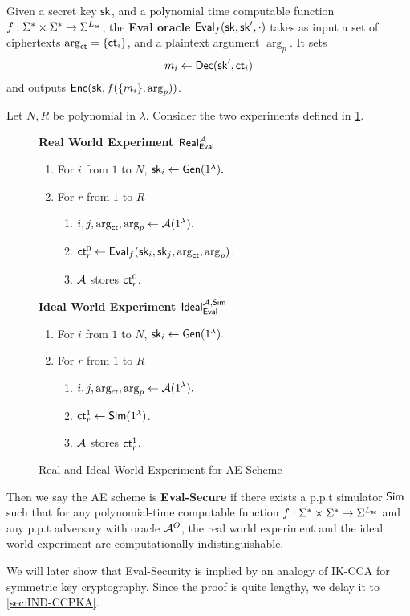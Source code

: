 \begin{definition}
\label{defn:AE-eval-oracle}
Given a secret key ${\mathsf{sk}}$, and a polynomial time computable function $f: \Sigma^* \times \Sigma^* \to \Sigma^{L_{\mathsf{ae}}}$, the \textbf{Eval oracle} $\mathsf{Eval}_{f}({\mathsf{sk}}, {\mathsf{sk}}', \cdot)$ takes as input a set of ciphertexts $\arg_{\mathsf{ct}} = \{\mathsf{ct}_i\}$, and a plaintext argument $\arg_{p}$. It sets 
$$m_i \leftarrow \mathsf{Dec}({\mathsf{sk}}', \mathsf{ct}_i)$$ 
and outputs $\mathsf{Enc}({\mathsf{sk}}, f(\{m_i\}, \arg_p))$.
\end{definition}
\begin{definition}
\label{defn:AE-eval-security}
Let $N, R$ be polynomial in $\lambda$. Consider the two experiments defined in \cref{expr:AE-real-ideal-world}.

\begin{figure}[h!]
\begin{framed}
\textbf{Real World Experiment $\mathsf{Real}_{\mathsf{Eval}}^{\mathcal{A}}$}
\begin{enumerate}
    \item For $i$ from $1$ to $N$, ${\mathsf{sk}}_i \leftarrow \mathsf{Gen}(1^{\lambda}).$
    \item For $r$ from $1$ to $R$
    \begin{enumerate}
        \item $i, j, \arg_{\mathsf{ct}}, \arg_p \leftarrow \mathcal{A}(1^{\lambda}).$
        \item $\mathsf{ct}^{0}_r \leftarrow \mathsf{Eval}_f({\mathsf{sk}}_i, {\mathsf{sk}}_j, \arg_{\mathsf{ct}}, \arg_p)$.
        \item $\mathcal{A}$ stores $\mathsf{ct}^{0}_r$.
    \end{enumerate}
\end{enumerate}
\textbf{Ideal World Experiment $\mathsf{Ideal}_{\mathsf{Eval}}^{\mathcal{A}, \mathsf{Sim}}$}
\begin{enumerate}
    \item For $i$ from $1$ to $N$, ${\mathsf{sk}}_i \leftarrow \mathsf{Gen}(1^{\lambda}).$
    \item For $r$ from $1$ to $R$
    \begin{enumerate}
        \item $i, j, \arg_{\mathsf{ct}}, \arg_p \leftarrow \mathcal{A}(1^{\lambda}).$
        \item $\mathsf{ct}^{1}_r \leftarrow \mathsf{Sim}(1^{\lambda})$.
        \item $\mathcal{A}$ stores $\mathsf{ct}^{1}_r$.
    \end{enumerate}
\end{enumerate}
\end{framed}
\caption{Real and Ideal World Experiment for AE Scheme}
\label{expr:AE-real-ideal-world}
\end{figure}

Then we say the AE scheme is \textbf{Eval-Secure} if there exists a p.p.t simulator $\mathsf{Sim}$ such that for any polynomial-time computable function $f: \Sigma^* \times \Sigma^* \to \Sigma^{L_{\mathsf{ae}}}$ and any p.p.t adversary with oracle $\mathcal{A}^O$, the real world experiment and the ideal world experiment are computationally indistinguishable.
\end{definition}
We will later show that Eval-Security is implied by an analogy of IK-CCA \cite[Definition 1]{BBDP01keyprivate} for symmetric key cryptography. Since the proof is quite lengthy, we delay it to \cref{sec:IND-CCPKA}.

